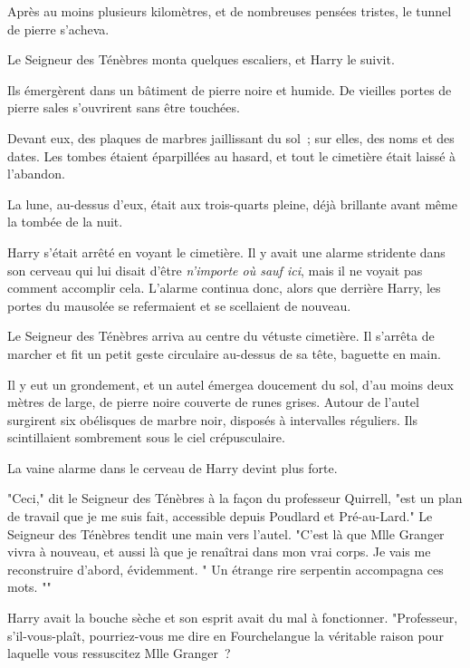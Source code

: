 Après au moins plusieurs kilomètres, et de nombreuses pensées tristes, le tunnel de pierre s'acheva.

Le Seigneur des Ténèbres monta quelques escaliers, et Harry le suivit.

Ils émergèrent dans un bâtiment de pierre noire et humide. De vieilles portes de pierre sales s'ouvrirent sans être touchées.

Devant eux, des plaques de marbres jaillissant du sol~; sur elles, des noms et des dates. Les tombes étaient éparpillées au hasard, et tout le cimetière était laissé à l'abandon.

La lune, au-dessus d'eux, était aux trois-quarts pleine, déjà brillante avant même la tombée de la nuit.

Harry s'était arrêté en voyant le cimetière. Il y avait une alarme stridente dans son cerveau qui lui disait d'être \emph{n'importe où sauf ici}, mais il ne voyait pas comment accomplir cela. L'alarme continua donc, alors que derrière Harry, les portes du mausolée se refermaient et se scellaient de nouveau.

Le Seigneur des Ténèbres arriva au centre du vétuste cimetière. Il s'arrêta de marcher et fit un petit geste circulaire au-dessus de sa tête, baguette en main.

Il y eut un grondement, et un autel émergea doucement du sol, d'au moins deux mètres de large, de pierre noire couverte de runes grises. Autour de l'autel surgirent six obélisques de marbre noir, disposés à intervalles réguliers. Ils scintillaient sombrement sous le ciel crépusculaire.

La vaine alarme dans le cerveau de Harry devint plus forte.

"Ceci," dit le Seigneur des Ténèbres à la façon du professeur Quirrell, "est un plan de travail que je me suis fait, accessible depuis Poudlard et Pré-au-Lard." Le Seigneur des Ténèbres tendit une main vers l'autel. "C'est là que Mlle Granger vivra à nouveau, et aussi là que je renaîtrai dans mon vrai corps. Je vais me reconstruire d'abord, évidemment. " Un étrange rire serpentin accompagna ces mots. ""

Harry avait la bouche sèche et son esprit avait du mal à fonctionner. "Professeur, s'il-vous-plaît, pourriez-vous me dire en Fourchelangue la véritable raison pour laquelle vous ressuscitez Mlle Granger~?

